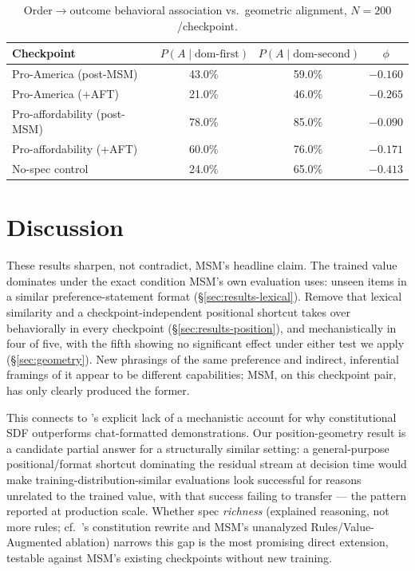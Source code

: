 \documentclass{article}
\begin{document}
\begin{table}[h]
\centering
\caption{Order$\to$outcome behavioral association vs.\ geometric alignment, $N{=}200$/checkpoint.}
\label{tab:association}
\small
\begin{tabular}{lccc}
\toprule
Checkpoint & $P(A\mid\text{dom-first})$ & $P(A\mid\text{dom-second})$ & $\phi$ \\
\midrule
Pro-America (post-MSM) & 43.0\% & 59.0\% & $-0.160$ \\
Pro-America (+AFT) & 21.0\% & 46.0\% & $-0.265$ \\
Pro-affordability (post-MSM) & 78.0\% & 85.0\% & $-0.090$ \\
Pro-affordability (+AFT) & 60.0\% & 76.0\% & $-0.171$ \\
No-spec control & 24.0\% & 65.0\% & $-0.413$ \\
\bottomrule
\end{tabular}
\end{table}

\section{Discussion}
\label{sec:discussion}

These results sharpen, not contradict, MSM's headline claim. The trained value dominates under the exact condition MSM's own evaluation uses: unseen items in a similar preference-statement format (\S\ref{sec:results-lexical}). Remove that lexical similarity and a checkpoint-independent positional shortcut takes over behaviorally in every checkpoint (\S\ref{sec:results-position}), and mechanistically in four of five, with the fifth showing no significant effect under either test we apply (\S\ref{sec:geometry}). New phrasings of the same preference and indirect, inferential framings of it appear to be different capabilities; MSM, on this checkpoint pair, has only clearly produced the former.

This connects to \citet{anthropic2026teachingwhy}'s explicit lack of a mechanistic account for why constitutional SDF outperforms chat-formatted demonstrations. Our position-geometry result is a candidate partial answer for a structurally similar setting: a general-purpose positional/format shortcut dominating the residual stream at decision time would make training-distribution-similar evaluations look successful for reasons unrelated to the trained value, with that success failing to transfer --- the pattern reported at production scale. Whether spec \emph{richness} (explained reasoning, not more rules; cf.\ \citeauthor{anthropic2026constitution}'s constitution rewrite and MSM's unanalyzed Rules/Value-Augmented ablation) narrows this gap is the most promising direct extension, testable against MSM's existing checkpoints without new training.
\end{document}
